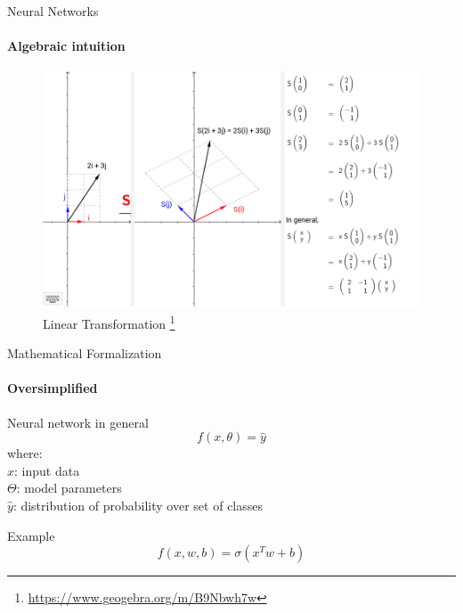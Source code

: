 \documentclass{beamer}
\begin{document}
\begin{frame}{Neural Networks}
\framesubtitle{Algebraic intuition}
\begin{figure}
    \centering
    \includegraphics[width = .7\textwidth]{images/linear-transformation.png}
    \caption{Linear Transformation \footnote{\url{https://www.geogebra.org/m/B9Nbwh7w}}}
\end{figure}{}
\end{frame}




\begin{frame}{Mathematical Formalization}
\framesubtitle{Oversimplified}
        \begin{block}{Neural network in general}
        \begin{equation}
        f(x, \theta) = \hat{y} 
        \end{equation}
        where:\\
        $x$: input data\\
        $\Theta$: model parameters\\ 
        $\hat{y}$: distribution of probability over set of classes
        \end{block}\pause
        
        \begin{block}{Example}
        \begin{equation}
        f(x, w, b) = \sigma (x^{T}w + b)
        \end{equation}
        \end{block}
\end{frame}
\end{document}
